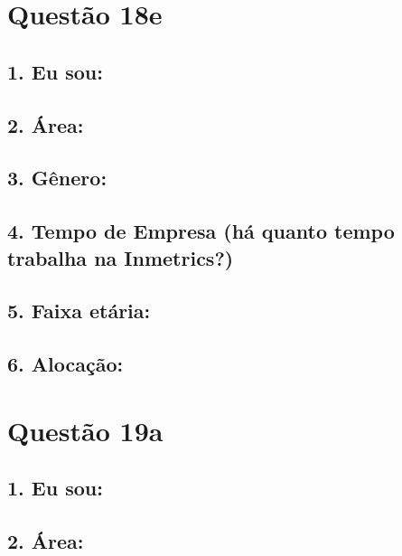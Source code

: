 \documentclass[]{book}
\begin{document}
\hypertarget{questao-18e}{%
\section{Questão 18e}\label{questao-18e}}

\hypertarget{eu-sou-44}{%
\subsection{1. Eu sou:}\label{eu-sou-44}}

\hypertarget{area-44}{%
\subsection{2. Área:}\label{area-44}}

\hypertarget{genero-44}{%
\subsection{3. Gênero:}\label{genero-44}}

\hypertarget{tempo-de-empresa-ha-quanto-tempo-trabalha-na-inmetrics-44}{%
\subsection{4. Tempo de Empresa (há quanto tempo trabalha na Inmetrics?)}\label{tempo-de-empresa-ha-quanto-tempo-trabalha-na-inmetrics-44}}

\hypertarget{faixa-etaria-44}{%
\subsection{5. Faixa etária:}\label{faixa-etaria-44}}

\hypertarget{alocacao-44}{%
\subsection{6. Alocação:}\label{alocacao-44}}

\hypertarget{questao-19a}{%
\section{Questão 19a}\label{questao-19a}}

\hypertarget{eu-sou-45}{%
\subsection{1. Eu sou:}\label{eu-sou-45}}

\hypertarget{area-45}{%
\subsection{2. Área:}\label{area-45}}
\end{document}

